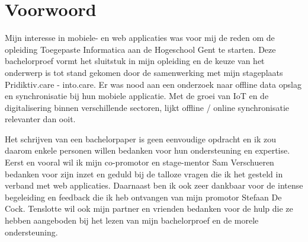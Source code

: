 
\chapter*{Voorwoord}
\label{ch:voorwoord}


Mijn interesse in mobiele- en web applicaties was voor mij de reden om de opleiding Toegepaste Informatica aan de Hogeschool Gent te starten. Deze bachelorproef vormt het sluitstuk in mijn opleiding en de keuze van het onderwerp is tot stand gekomen door de samenwerking met mijn stageplaats Pridiktiv.care - into.care. Er was nood aan een onderzoek naar offline data opslag en synchronisatie bij hun mobiele applicatie. Met de groei van IoT en de digitalisering binnen verschillende sectoren, lijkt offline / online synchronisatie relevanter dan ooit.

Het schrijven van een bachelorpaper is geen eenvoudige opdracht en ik zou daarom enkele personen willen bedanken voor hun ondersteuning en expertise. Eerst en vooral wil ik mijn co-promotor en stage-mentor Sam Verschueren bedanken voor zijn inzet en geduld bij de talloze vragen die ik het gesteld in verband met web applicaties. Daarnaast ben ik ook zeer dankbaar voor de intense begeleiding en feedback die ik heb ontvangen van mijn promotor Stefaan De Cock. Tenslotte wil ook mijn partner en vrienden bedanken voor de hulp die ze hebben aangeboden bij het lezen van mijn bachelorproef en de morele ondersteuning.